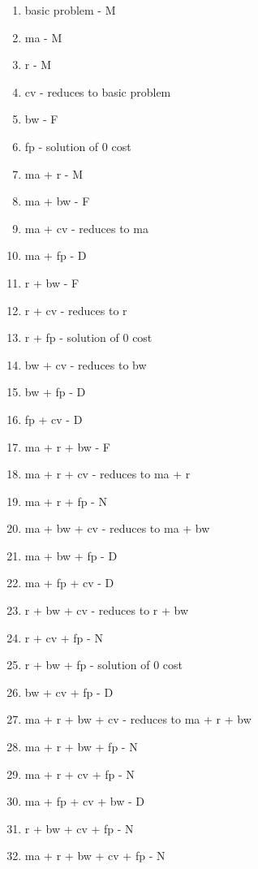 \begin{enumerate}
\item basic problem - M
\item ma - M
\item r - M
\item cv - reduces to basic problem
\item bw - F
\item fp - solution of 0 cost
\item ma + r - M
\item  ma + bw - F
\item ma + cv - reduces to ma
\item ma + fp - D
\item r + bw - F
\item r + cv - reduces to r
\item r + fp - solution of 0 cost
\item bw + cv - reduces to bw
\item bw + fp - D
\item fp + cv - D
\item ma + r + bw - F
\item ma + r + cv - reduces to ma + r
\item ma + r + fp - N
\item ma + bw + cv - reduces to ma + bw
\item ma + bw + fp - D
\item ma + fp + cv - D
\item r + bw + cv - reduces to r + bw
\item r + cv + fp - N
\item r + bw + fp - solution of 0 cost
\item bw + cv + fp - D
\item ma + r + bw + cv - reduces to ma + r + bw
\item ma + r + bw + fp - N
\item ma + r + cv + fp - N
\item ma + fp + cv + bw - D
\item r + bw + cv + fp - N
\item ma + r + bw + cv + fp - N
\end{enumerate}